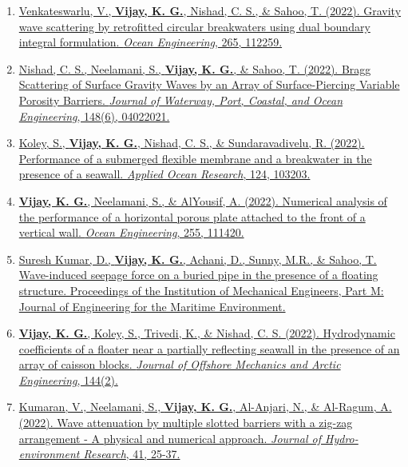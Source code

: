 \begin{enumerate}[label=\protect\circled{\arabic*}]
\item \href{https://doi.org/10.1016/j.oceaneng.2022.112259}{%
Venkateswarlu, V., \textbf{Vijay, K. G.}, Nishad, C. S., \& Sahoo, T. (2022). Gravity wave scattering by retrofitted circular breakwaters using dual boundary integral formulation. \textit{Ocean Engineering}, 265, 112259.}

\item \href{https://doi.org/10.1061/(ASCE)WW.1943-5460.0000729}{%
Nishad, C. S., Neelamani, S., \textbf{Vijay, K. G.}, \& Sahoo, T. (2022). Bragg Scattering of Surface Gravity Waves by an Array of Surface-Piercing Variable Porosity Barriers. \textit{Journal of Waterway, Port, Coastal, and Ocean Engineering}, 148(6), 04022021.}

\item \href{https://doi.org/10.1016/j.apor.2022.103203}{%
Koley, S., \textbf{Vijay, K. G.}, Nishad, C. S., \& Sundaravadivelu, R. (2022). Performance of a submerged flexible membrane and a breakwater in the presence of a seawall. \textit{Applied Ocean Research}, 124, 103203.}

\item \href{https://doi.org/10.1016/j.oceaneng.2022.111420}{%
\textbf{Vijay, K. G.}, Neelamani, S., \& AlYousif, A. (2022). Numerical analysis of the performance of a horizontal porous plate attached to the front of a vertical wall. \textit{Ocean Engineering}, 255, 111420.}

\item \href{https://doi.org/10.1177/14750902221096019}{%
Suresh Kumar, D., \textbf{Vijay, K. G.}, Achani, D., Sunny, M.R., \& Sahoo, T. Wave-induced seepage force on a buried pipe in the presence of a floating structure. Proceedings of the Institution of Mechanical Engineers, Part M: Journal of Engineering for the Maritime Environment.}

\item \href{https://doi.org/10.1115/1.4052635}{%
\textbf{Vijay, K. G.}, Koley, S., Trivedi, K., \& Nishad, C. S. (2022). Hydrodynamic coefficients of a floater near a partially reflecting seawall in the presence of an array of caisson blocks. \textit{Journal of Offshore Mechanics and Arctic Engineering}, 144(2).}

\item \href{https://doi.org/10.1016/j.jher.2022.02.001}{%
Kumaran, V., Neelamani, S., \textbf{Vijay, K. G.}, Al-Anjari, N., \& Al-Ragum, A. (2022). Wave attenuation by multiple slotted barriers with a zig-zag arrangement - A physical and numerical approach. \textit{Journal of Hydro-environment Research}, 41, 25-37.}


\end{enumerate}
